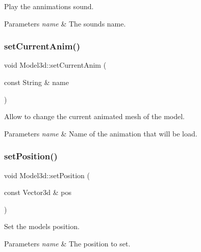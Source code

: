 Play the annimation\textquotesingle{}s sound. 


\begin{DoxyParams}{Parameters}
{\em name} & The sound\textquotesingle{}s name. \\
\hline
\end{DoxyParams}
\mbox{\label{classModel3d_a29eeaa6769b0c21268f4704ac2d404b7}} 
\subsubsection{\texorpdfstring{set\+Current\+Anim()}{setCurrentAnim()}}
{\footnotesize\ttfamily void Model3d\+::set\+Current\+Anim (\begin{DoxyParamCaption}\item[{const String \&}]{name }\end{DoxyParamCaption})}



Allow to change the current animated mesh of the model. 


\begin{DoxyParams}{Parameters}
{\em name} & Name of the animation that will be load. \\
\hline
\end{DoxyParams}
\mbox{\label{classModel3d_a971b77ce978903443e71187ceafa1528}} 
\subsubsection{\texorpdfstring{set\+Position()}{setPosition()}}
{\footnotesize\ttfamily void Model3d\+::set\+Position (\begin{DoxyParamCaption}\item[{const Vector3d \&}]{pos }\end{DoxyParamCaption})}



Set the model\textquotesingle{}s position. 


\begin{DoxyParams}{Parameters}
{\em name} & The position to set. \\
\hline
\end{DoxyParams}
\mbox{\label{classModel3d_adc3c185a679687b4bf483f89eb2c20a9}} 

